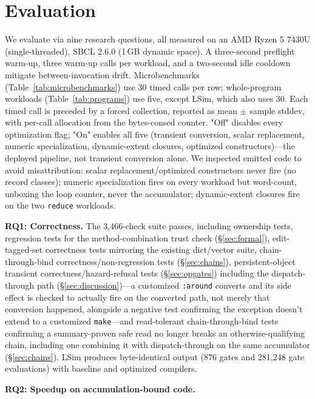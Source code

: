 \documentclass[sigplan,review,anonymous]{acmart}
\begin{document}
\section{Evaluation}
\label{sec:eval}
We evaluate via nine research questions, all measured on an AMD Ryzen 5 7430U (single-threaded), SBCL 2.6.0 (1\,GB dynamic space). A three-second preflight warm-up, three warm-up calls per workload, and a two-second idle cooldown mitigate between-invocation drift. Microbenchmarks (Table~\ref{tab:microbenchmarks}) use 30 timed calls per row; whole-program workloads (Table~\ref{tab:programs}) use five, except LSim, which also uses 30. Each timed call is preceded by a forced collection, reported as mean $\pm$ sample stddev, with per-call allocation from the bytes-consed counter. "Off" disables every optimization flag; "On" enables all five (transient conversion, scalar replacement, numeric specialization, dynamic-extent closures, optimized constructors)---the deployed pipeline, not transient conversion alone. We inspected emitted code to avoid misattribution: scalar replacement/optimized constructors never fire (no record classes); numeric specialization fires on every workload but word-count, unboxing the loop counter, never the accumulator; dynamic-extent closures fire on the two \texttt{reduce} workloads.

\textbf{RQ1: Correctness.} The 3,466-check suite passes, including ownership tests, regression tests for the method-combination trust check (§\ref{sec:formal}), edit-tagged-set correctness tests mirroring the existing dict/vector suite, chain-through-bind correctness/non-regression tests (§\ref{sec:chains}), persistent-object transient correctness/hazard-refusal tests (§\ref{sec:opgates}) including the dispatch-through path (§\ref{sec:discussion})---a customized \texttt{:around} converts and its side effect is checked to actually fire on the converted path, not merely that conversion happened, alongside a negative test confirming the exception doesn't extend to a customized \texttt{make}---and read-tolerant chain-through-bind tests confirming a summary-proven safe read no longer breaks an otherwise-qualifying chain, including one combining it with dispatch-through on the same accumulator (§\ref{sec:chains}). LSim produces byte-identical output (876 gates and 281,248 gate evaluations) with baseline and optimized compilers.

\textbf{RQ2: Speedup on accumulation-bound code.}
\end{document}
